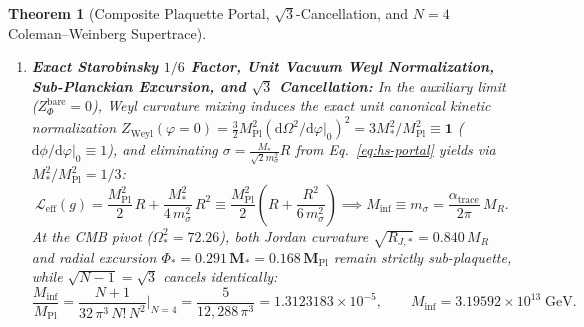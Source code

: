 \documentclass[11pt,a4paper]{article}
\newtheorem{theorem}{Theorem}[section]
\begin{document}
\begin{theorem}[Composite Plaquette Portal, \texorpdfstring{$\sqrt{3}$}{sqrt(3)}-Cancellation, and \texorpdfstring{$N = 4$}{N = 4} Coleman--Weinberg Supertrace]
\begin{enumerate}[label=(\alph*),leftmargin=1.8em,itemsep=3pt]
\begin{equation}
V_{\mathrm{CW}}(\varphi) = \frac{n_{\mathrm{eff}}^{\mathrm{STr}}}{64\pi^2}\left[\bigl(M_R + \alpha_{\mathrm{trace}}\varphi\bigr)^4\left(\ln\frac{(M_R + \alpha_{\mathrm{trace}}\varphi)^2}{M_R^2} - \frac{1}{2}\right) + \frac{1}{2}M_R^4\right],
\end{equation}
satisfies $V_{\mathrm{CW}}(0) = V_{\mathrm{CW}}'(0) = 0$ and fixes the effective matching curvature and quartic:
\begin{equation}
m_\sigma^2 := V_{\mathrm{CW}}''(0) = \frac{\alpha_{\mathrm{trace}}^2}{4\pi^2}\,M_R^2 = \frac{25}{768\pi^2}\,M_R^2 \implies \lambda_\Phi = \left(\frac{\alpha_{\mathrm{trace}}}{2\pi}\right)^2 = 3.298\times 10^{-3}.
\label{eq:msigma-cw}
\end{equation}
\item \textbf{Exact Starobinsky $1/6$ Factor, Unit Vacuum Weyl Normalization, Sub-Planckian Excursion, and $\sqrt{3}$ Cancellation:} In the auxiliary limit ($Z_\Phi^{\mathrm{bare}} = 0$), Weyl curvature mixing induces the exact unit canonical kinetic normalization $Z_{\mathrm{Weyl}}(\varphi = 0) = \frac{3}{2}M_{\mathrm{Pl}}^2(\mathrm{d}\Omega^2/\mathrm{d}\varphi|_0)^2 = 3M_*^2/M_{\mathrm{Pl}}^2 \equiv \mathbf{1}$ ($\mathrm{d}\phi/\mathrm{d}\varphi|_0 \equiv 1$), and eliminating $\sigma = \frac{M_*}{\sqrt{2}m_\sigma^2}R$ from Eq.~\eqref{eq:hs-portal} yields via $M_*^2/M_{\mathrm{Pl}}^2 = 1/3$:
\begin{equation}
\mathcal{L}_{\mathrm{eff}}(g) = \frac{M_{\mathrm{Pl}}^2}{2}\,R + \frac{M_*^2}{4\,m_\sigma^2}\,R^2 \equiv \frac{M_{\mathrm{Pl}}^2}{2}\!\left(R + \frac{R^2}{6\,m_\sigma^2}\right) \implies M_{\mathrm{inf}} \equiv m_\sigma = \frac{\alpha_{\mathrm{trace}}}{2\pi}\,M_R.
\label{eq:starobinsky-emergence}
\end{equation}
At the CMB pivot ($\Omega_*^2 = 72.26$), both Jordan curvature $\sqrt{R_{J,*}} = 0.840\,M_R$ and radial excursion $\Phi_* = \mathbf{0.291\,M_*} = \mathbf{0.168\,M_{\mathrm{Pl}}}$ remain strictly sub-plaquette, while $\sqrt{N-1} = \sqrt{3}$ cancels identically:
\begin{equation}
\boxed{\frac{M_{\mathrm{inf}}}{M_{\mathrm{Pl}}} = \frac{N + 1}{32\,\pi^3\,N!\,N^2}\Bigg|_{N=4} = \frac{5}{12{,}288\,\pi^3} = 1.3123183\times 10^{-5}, \qquad M_{\mathrm{inf}} = 3.19592\times 10^{13}\;\mathrm{GeV}.}
\label{eq:minf-exact}
\end{equation}

\end{enumerate}
\end{theorem}
\end{document}
